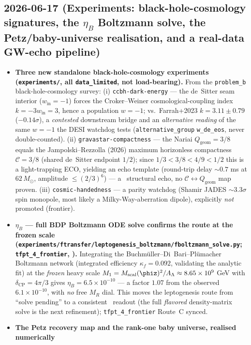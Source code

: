 \documentclass[11pt]{article}
\begin{document}
\subsection*{2026-06-17 (Experiments: black-hole-cosmology signatures, the $\eta_B$ Boltzmann solve, the Petz/baby-universe realisation, and a real-data GW-echo pipeline)}
\begin{itemize}
\item \textbf{Three new standalone black-hole-cosmology experiments (\texttt{experiments/}, all
  \texttt{data\_limited}, not load-bearing).} From the \texttt{problem\_b} black-hole-cosmology survey:
  (i) \texttt{ccbh-dark-energy} --- the de~Sitter seam interior ($w_{\mathrm{in}}{=}{-}1$) forces the
  Croker--Weiner cosmological-coupling index $k={-}3w_{\mathrm{in}}=3$, hence a population $w={-}1$;
  vs.\ Farrah+2023 $k=3.11\pm0.79$ ($-0.14\sigma$), a \emph{contested} downstream bridge and an
  \emph{alternative reading} of the same $w={-}1$ the DESI watchdog tests (\texttt{alternative\_group}
  \texttt{w\_de\_eos}, never double-counted). (ii) \texttt{gravastar-compactness} --- the Nariai
  $Q_{\mathrm{geom}}{=}3/8$ equals the Jampolski--Rezzolla (2026) maximum horizonless compactness
  $\mathcal C{=}3/8$ (shared de~Sitter endpoint $1/2$); since $1/3{<}3/8{<}4/9{<}1/2$ this is a
  light-trapping ECO, yielding an echo template (round-trip delay ${\sim}0.7$ ms at $62\,M_\odot$,
  amplitude $\le(2/3)^6$) --- a \mC\ structural echo, no $\mathcal C\!\leftrightarrow\!Q_{\mathrm{geom}}$
  map proven. (iii) \texttt{cosmic-handedness} --- a parity watchdog (Shamir JADES ${\sim}3.3\sigma$
  spin monopole, most likely a Milky-Way-aberration dipole), explicitly \emph{not} promoted (frontier).
\item \textbf{$\eta_B$ --- full BDP Boltzmann ODE solve confirms the route at the frozen scale
  (\texttt{experiments/ftransfer/leptogenesis\_boltzmann/fboltzmann\_solve.py}; \texttt{tfpt\_4\_frontier},
  \mC).} Integrating the Buchm\"uller--Di~Bari--Pl\"umacher Boltzmann network (integrated efficiency
  $\kappa_f=0.092$, validating the analytic fit) at the \emph{frozen} heavy scale
  $M_1=M_{\mathrm{scal}}(\phiz)^2/A_\Lambda\approx8.65\times10^9$ GeV with $\delta_{\mathrm{CP}}=4\pi/3$ gives
  $\eta_B=6.5\times10^{-10}$ --- a factor $1.07$ from the observed $6.1\times10^{-10}$, with \emph{no} free
  $M_R$ dial. This moves the leptogenesis route from ``solve pending'' to a consistent \mC\ readout (the full
  \emph{flavored} density-matrix solve is the next refinement); \texttt{tfpt\_4\_frontier} Route~C synced.
\item \textbf{The Petz recovery map and the rank-one baby universe, realised numerically
}
\end{itemize}
\end{document}
